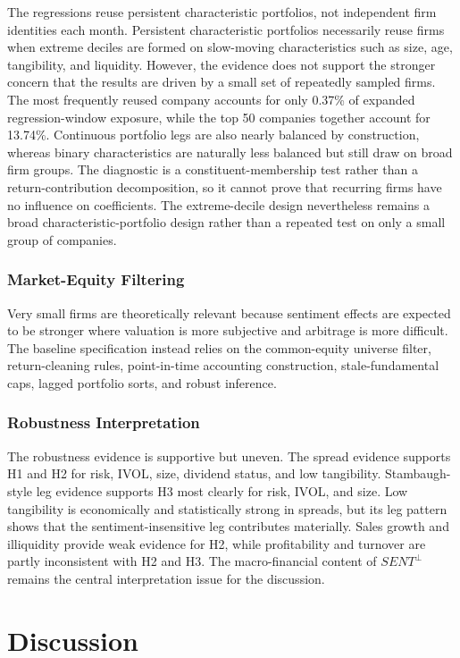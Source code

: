 \documentclass[11pt]{article}
\newcommand{\var}[1]{\ensuremath{#1}}
\begin{document}
The regressions reuse persistent characteristic portfolios, not independent firm identities each month. Persistent characteristic portfolios necessarily reuse firms when extreme deciles are formed on slow-moving characteristics such as size, age, tangibility, and liquidity. However, the evidence does not support the stronger concern that the results are driven by a small set of repeatedly sampled firms. The most frequently reused company accounts for only 0.37\% of expanded regression-window exposure, while the top 50 companies together account for 13.74\%. Continuous portfolio legs are also nearly balanced by construction, whereas binary characteristics are naturally less balanced but still draw on broad firm groups. The diagnostic is a constituent-membership test rather than a return-contribution decomposition, so it cannot prove that recurring firms have no influence on coefficients. The extreme-decile design nevertheless remains a broad characteristic-portfolio design rather than a repeated test on only a small group of companies.

\subsubsection{Market-Equity Filtering}
Very small firms are theoretically relevant because sentiment effects are expected to be stronger where valuation is more subjective and arbitrage is more difficult. The baseline specification instead relies on the common-equity universe filter, return-cleaning rules, point-in-time accounting construction, stale-fundamental caps, lagged portfolio sorts, and robust inference.

\subsubsection{Robustness Interpretation}
The robustness evidence is supportive but uneven. The spread evidence supports H1 and H2 for risk, IVOL, size, dividend status, and low tangibility. Stambaugh-style leg evidence supports H3 most clearly for risk, IVOL, and size. Low tangibility is economically and statistically strong in spreads, but its leg pattern shows that the sentiment-insensitive leg contributes materially. Sales growth and illiquidity provide weak evidence for H2, while profitability and turnover are partly inconsistent with H2 and H3. The macro-financial content of \var{SENT^{\perp}} remains the central interpretation issue for the discussion.

\section{Discussion}
\end{document}
